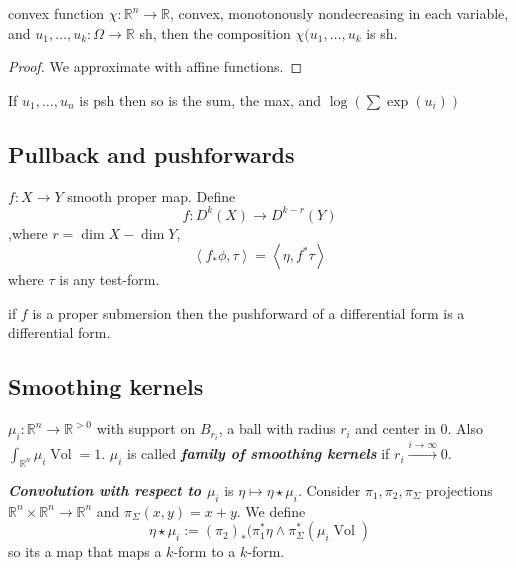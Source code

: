 \begin{thm}\leavevmode
convex function \(\chi: \mathbb{R}^n \to \mathbb{R}\), convex, monotonously nondecreasing in each variable, and \(u_1,\ldots,u_k : \Omega \to \mathbb{R}\) sh, then the composition \(\chi(u_1,\ldots,u_k\) is sh.
\end{thm}

\begin{proof}\leavevmode
We approximate with affine functions.
\end{proof}

\begin{coro}\leavevmode
If \(u_1,\ldots, u_n\) is psh then so is the sum, the max, and \(\operatorname{log}\left(\sum \operatorname{exp}(u_i)\right) \)
\end{coro}

\subsection{Pullback and pushforwards}

\begin{defn}\leavevmode
\(f: X \to Y\) smooth proper map. Define
\[f:D^k(X) \to D^{k-r}(Y)\]
,where \(r = \dim X - \dim Y\), 
\[\left<f_*\phi,\tau\right>=\left<\eta,f^*\tau\right>\]
where \(\tau\) is any test-form.
\end{defn}

\begin{claim}\leavevmode
if \(f\) is a proper submersion then the pushforward of a differential form is a differential form.
\end{claim}

\subsection{Smoothing kernels}

\begin{defn}\leavevmode
\(\mu_i: \mathbb{R}^n \to \mathbb{R}^{>0}\) with support on \(B_{r_i}\), a ball with radius \(r_i\) and center in 0. Also \(\int_{\mathbb{R}^n} \mu_i \operatorname{Vol}=1\). \(\mu_i\) is called \textit{\textbf{family of smoothing kernels}} if \(r_i \xrightarrow{i \to \infty}0\).

\textit{\textbf{Convolution with respect to \(\mu_i\)}} is \(\eta \mapsto  \eta \star\mu_i\). Consider \(\pi_1,\pi_2,\pi_\Sigma\) projections \(\mathbb{R}^n \times \mathbb{R}^n \to \mathbb{R}^n\) and \(\pi_\Sigma(x,y)=x+y\). We define
\[\eta \star \mu_i:=(\pi_2)_*(\pi_1^*\eta\wedge\pi_\Sigma ^*(\mu_i\operatorname{Vol})\]
so its a map that maps a \(k\)-form to a \(k\)-form.
\end{defn}

